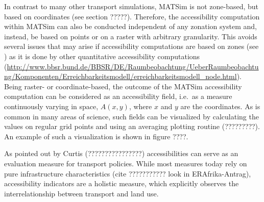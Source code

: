 In contrast to many other transport simulations, MATSim is not zone-based, but based on coordinates (see section ?????). Therefore, the accessibility computation within MATSim can also be conducted independent of any zonation system and, instead, be based on points or on a raster with arbitrary granularity. This avoids several issues that may arise if accessibility computations are based on zones (see \citep[e.g.][]{NicolaiNagel2012HiResAccessibilityMethodInBook}) as it is done by other quantitative accessibility computations 
%
%
(\url{http://www.bbsr.bund.de/BBSR/DE/Raumbeobachtung/UeberRaumbeobachtung/Komponenten/Erreichbarkeitsmodell/erreichbarkeitsmodell_node.html}). Being raster- or coordinate-based, the outcome of the MATSim accessibility computation can be considered as an accessibility field,
i.e.\ as a measure continuously varying in space, $A(x,y)$, where $x$ and $y$
are the coordinates. As is common in many areas of science, such
fields can be visualized by calculating the values on regular grid
points and using an averaging plotting routine (?????????). An example of such a visualization is shown in figure ????.

As pointed out by Curtis (????????????????) accessibilities can serve as an evaluation measure for transport policies. While most measures today rely on pure infrastructure characteristics (cite ??????????? look in ERAfrika-Antrag), accessibility indicators are a holistic measure, which explicitly observes the interrelationship between transport and land use.

